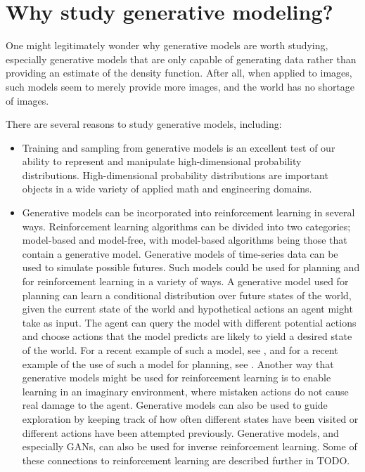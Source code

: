 \section{Why study generative modeling?}
\label{sec:why}

One might legitimately wonder why generative models are worth studying,
especially generative models that are only capable of generating data
rather than providing an estimate of the density function.
After all, when applied to images, such models seem to merely provide
more images, and the world has no shortage of images.

There are several reasons to study generative models, including:
\begin{itemize}

\item Training and sampling from generative models is an excellent test
of our ability to represent and manipulate high-dimensional probability
distributions.
High-dimensional probability distributions are important objects in a
wide variety of applied math and engineering domains.

\item Generative models can be incorporated into reinforcement learning in several
  ways.
  Reinforcement learning algorithms can be divided into two categories;
  model-based and model-free, with model-based algorithms being those that
  contain a generative model.
  Generative models of time-series data can be used to simulate possible
futures. Such models could be used for planning and for reinforcement learning
in a variety of ways.
A generative model used for planning can learn a conditional distribution over
future states of the world, given the current state of the world and hypothetical
actions an agent might take as input.
The agent can query the model with different potential actions and choose actions
that the model predicts are likely to yield a desired state of the world.
For a recent example of such a model, see \citet{finn2016unsupervised},
and for a recent example of the use of such a model for planning,
see \citet{finn2016deep}. 
Another way that generative models might be used for reinforcement learning is
to enable learning in an imaginary environment, where mistaken actions do not
cause real damage to the agent.
Generative models can also be used to guide exploration by keeping track of
how often different states have been visited or different actions have been
attempted previously.
Generative models, and especially GANs, can also be used for inverse reinforcement
learning.
Some of these connections to reinforcement learning are described further in
TODO.


\end{itemize}
